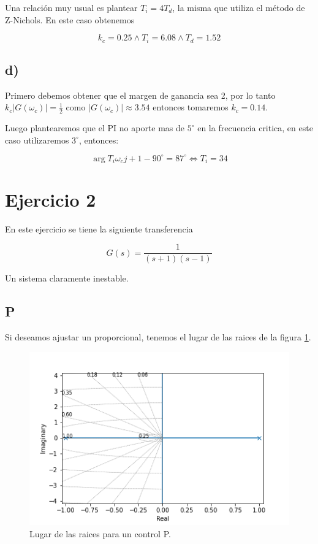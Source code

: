\documentclass{article}
\begin{document}
        Una relación muy usual es plantear $T_i = 4T_d$, la misma que utiliza el método de Z-Nichols. En este caso obtenemos 

        \begin{equation}
            k_c = 0.25 \land T_i = 6.08 \land T_d = 1.52
        \end{equation}

        \subsection{d)}

        Primero debemos obtener que el margen de ganancia sea 2, por lo tanto $k_c|G(\omega_c)|=\frac{1}{2}$ como
        $|G(\omega_c)|\approx3.54$ entonces tomaremos $k_c=0.14$.
        
        Luego plantearemos que el PI no aporte mas de $5^\circ$ en la frecuencia critica, en este caso utilizaremos $3^\circ$, entonces:

        \begin{equation}
            \arg{ T_i\omega_cj +1 } - 90^\circ = 87^\circ \Leftrightarrow T_i = 34
        \end{equation}


    \section{Ejercicio 2}

        En este ejercicio se tiene la siguiente transferencia 

        \begin{equation}
            G(s) = \frac{1}{(s+1)(s-1)}
        \end{equation}

        Un sistema claramente inestable.

        \subsection{P}

        Si deseamos ajustar un proporcional, tenemos el lugar de las raices de la figura \ref{fig:2-P}.

        \begin{figure}[!htb]
            \centering
            \includegraphics[width=.4\textwidth]{Img/2-P.png}
            \caption{Lugar de las raices para un control P.}
            \label{fig:2-P}
        \end{figure}
\end{document}
